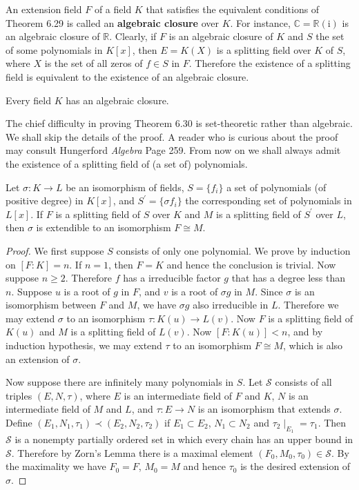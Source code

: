 An extension field $F$ of a field $K$ that satisfies the equivalent conditions of Theorem 6.29 is called an \textbf{algebraic closure} over $K$. For instance, $\mathbb{C}=\mathbb{R}(\mathrm{i})$ is an algebraic closure of $\mathbb{R}$. Clearly, if $F$ is an algebraic closure of $K$ and $S$ the set of some polynomials in $K[x]$, then $E=K(X)$ is a splitting field over $K$ of $S$, where $X$ is the set of all zeros of $f\in S$ in $F$. Therefore the existence of a splitting field is equivalent to the existence of an algebraic closure.
\begin{theorem}
Every field $K$ has an algebraic closure.
\end{theorem}
The chief difficulty in proving Theorem 6.30 is set-theoretic rather than algebraic. We shall skip the details of the proof. A reader who is curious about the proof may consult Hungerford \textit{Algebra} Page 259. From now on we shall always admit the existence of a splitting field of (a set of) polynomials.
\begin{theorem}
Let $\sigma:K\to L$ be an isomorphism of fields, $S=\{f_i\}$ a set of polynomials (of positive degree) in $K[x]$, and $S^\prime=\{\sigma f_i\}$ the corresponding set of polynomials in $L[x]$. If $F$ is a splitting field of $S$ over $K$ and $M$ is a splitting field of $S^\prime$ over $L$, then $\sigma$ is extendible to an isomorphism $F\cong M$.
\end{theorem}
\begin{proof}
We first suppose $S$ consists of only one polynomial. We prove by induction on $[F:K]=n$. If $n=1$, then $F=K$ and hence the conclusion is trivial. Now suppose $n\ge 2$. Therefore $f$ has a irreducible factor $g$ that has a degree less than $n$. Suppose $u$ is a root of $g$ in $F$, and $v$ is a root of $\sigma g$ in $M$. Since $\sigma$ is an isomorphism between $F$ and $M$, we have $\sigma g$ also irreducible in $L$. Therefore we may extend $\sigma$ to an isomorphism $\tau:K(u)\to L(v)$. Now $F$ is a splitting field of $K(u)$ and $M$ is a splitting field of $L(v)$. Now $[F:K(u)]<n$, and by induction hypothesis, we may extend $\tau$ to an isomorphism $F\cong M$, which is also an extension of $\sigma$.\par
Now suppose there are infinitely many polynomials in $S$. Let $\mathcal{S}$ consists of all triples $(E,N,\tau)$, where $E$ is an intermediate field of $F$ and $K$, $N$ is an intermediate field of $M$ and $L$, and $\tau:E\to N$ is an isomorphism that extends $\sigma$. Define $(E_1,N_1,\tau_1)\prec(E_2,N_2,\tau_2)$ if $E_1\subset E_2$, $N_1\subset N_2$ and $\tau_2\mid_{E_1}=\tau_1$. Then $\mathcal{S}$ is a nonempty partially ordered set in which every chain has an upper bound in $\mathcal{S}$. Therefore by Zorn's Lemma there is a maximal element $(F_0,M_0,\tau_0)\in\mathcal{S}$. By the maximality we have $F_0=F$, $M_0=M$ and hence $\tau_0$ is the desired extension of $\sigma$.
\end{proof}
